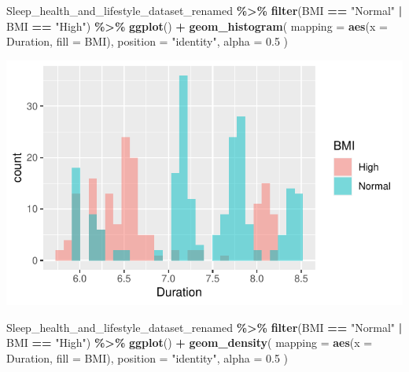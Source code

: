 \documentclass[
  11pt,
]{article}
\newenvironment{Shaded}{\begin{snugshade}}{\end{snugshade}}
\newcommand{\AttributeTok}[1]{\textcolor[rgb]{0.13,0.29,0.53}{#1}}
\newcommand{\FloatTok}[1]{\textcolor[rgb]{0.00,0.00,0.81}{#1}}
\newcommand{\FunctionTok}[1]{\textcolor[rgb]{0.13,0.29,0.53}{\textbf{#1}}}
\newcommand{\NormalTok}[1]{#1}
\newcommand{\SpecialCharTok}[1]{\textcolor[rgb]{0.81,0.36,0.00}{\textbf{#1}}}
\newcommand{\StringTok}[1]{\textcolor[rgb]{0.31,0.60,0.02}{#1}}
\begin{document}
\begin{Shaded}
\begin{Highlighting}[]
\NormalTok{Sleep\_health\_and\_lifestyle\_dataset\_renamed }\SpecialCharTok{\%\textgreater{}\%}
  \FunctionTok{filter}\NormalTok{(BMI }\SpecialCharTok{==} \StringTok{"Normal"} \SpecialCharTok{|}\NormalTok{ BMI }\SpecialCharTok{==} \StringTok{"High"}\NormalTok{) }\SpecialCharTok{\%\textgreater{}\%}
  \FunctionTok{ggplot}\NormalTok{() }\SpecialCharTok{+}
  \FunctionTok{geom\_histogram}\NormalTok{( }
    \AttributeTok{mapping =} \FunctionTok{aes}\NormalTok{(}\AttributeTok{x =}\NormalTok{ Duration, }\AttributeTok{fill =}\NormalTok{ BMI), }
    \AttributeTok{position =} \StringTok{"identity"}\NormalTok{,}
\AttributeTok{alpha =} \FloatTok{0.5}
\NormalTok{  )}
\end{Highlighting}
\end{Shaded}

\begin{center}\includegraphics[width=0.7\linewidth]{SleepHelath_files/figure-latex/unnamed-chunk-52-1} \end{center}

\begin{Shaded}
\begin{Highlighting}[]
\NormalTok{Sleep\_health\_and\_lifestyle\_dataset\_renamed }\SpecialCharTok{\%\textgreater{}\%}
  \FunctionTok{filter}\NormalTok{(BMI }\SpecialCharTok{==} \StringTok{"Normal"} \SpecialCharTok{|}\NormalTok{ BMI }\SpecialCharTok{==} \StringTok{"High"}\NormalTok{) }\SpecialCharTok{\%\textgreater{}\%}
  \FunctionTok{ggplot}\NormalTok{() }\SpecialCharTok{+}
  \FunctionTok{geom\_density}\NormalTok{( }
    \AttributeTok{mapping =} \FunctionTok{aes}\NormalTok{(}\AttributeTok{x =}\NormalTok{ Duration, }\AttributeTok{fill =}\NormalTok{ BMI), }
    \AttributeTok{position =} \StringTok{"identity"}\NormalTok{,}
\AttributeTok{alpha =} \FloatTok{0.5}
\NormalTok{  )}
\end{Highlighting}
\end{Shaded}
\end{document}
